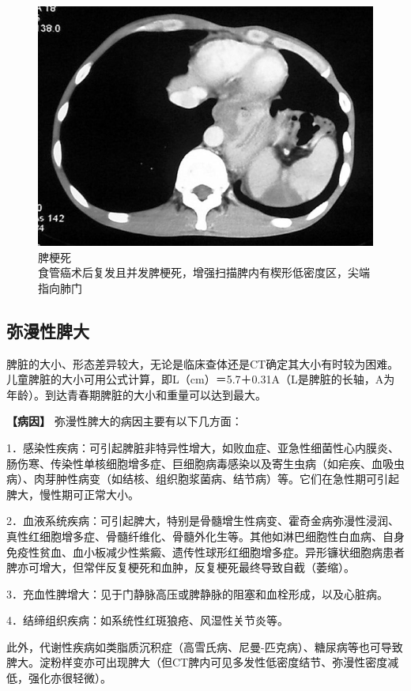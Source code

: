 \begin{figure}[!htbp]
 \centering
 \includegraphics[width=.7\textwidth,height=\textheight,keepaspectratio]{./images/Image00313.jpg}
 \captionsetup{justification=centering}
 \caption{脾梗死\\{\small 食管癌术后复发且并发脾梗死，增强扫描脾内有楔形低密度区，尖端指向肺门}}
 \label{fig14-5}
  \end{figure} 

\subsection{弥漫性脾大}

脾脏的大小、形态差异较大，无论是临床查体还是CT确定其大小有时较为困难。儿童脾脏的大小可用公式计算，即L（cm）＝5.7＋0.31A（L是脾脏的长轴，A为年龄）。到达青春期脾脏的大小和重量可以达到最大。

\textbf{【病因】} 弥漫性脾大的病因主要有以下几方面：

1．感染性疾病：可引起脾脏非特异性增大，如败血症、亚急性细菌性心内膜炎、肠伤寒、传染性单核细胞增多症、巨细胞病毒感染以及寄生虫病（如疟疾、血吸虫病）、肉芽肿性病变（如结核、组织胞浆菌病、结节病）等。它们在急性期可引起脾大，慢性期可正常大小。

2．血液系统疾病：可引起脾大，特别是骨髓增生性病变、霍奇金病弥漫性浸润、真性红细胞增多症、骨髓纤维化、骨髓外化生等。其他如淋巴细胞性白血病、自身免疫性贫血、血小板减少性紫癜、遗传性球形红细胞增多症。异形镰状细胞病患者脾亦可增大，但常伴反复梗死和血肿，反复梗死最终导致自截（萎缩）。

3．充血性脾增大：见于门静脉高压或脾静脉的阻塞和血栓形成，以及心脏病。

4．结缔组织疾病：如系统性红斑狼疮、风湿性关节炎等。

此外，代谢性疾病如类脂质沉积症（高雪氏病、尼曼-匹克病）、糖尿病等也可导致脾大。淀粉样变亦可出现脾大（但CT脾内可见多发性低密度结节、弥漫性密度减低，强化亦很轻微）。


